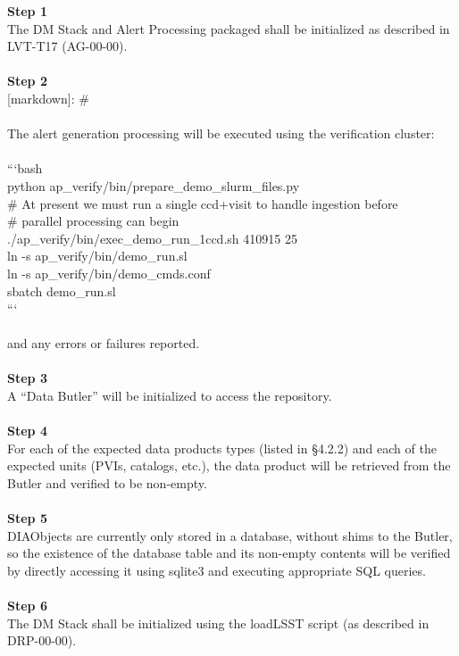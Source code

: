 \textbf{Step 1}\\
The DM Stack and Alert Processing packaged shall be initialized as
described in LVT-T17 (AG-00-00).\\
~\\
\textbf{Step 2}\\
{[}markdown{]}: \#\\
~\\
The alert generation processing will be executed using the verification
cluster:\\
~\\
```bash\\
python ap\_verify/bin/prepare\_demo\_slurm\_files.py\\
\# At present we must run a single ccd+visit to handle ingestion
before\\
\# parallel processing can begin\\
./ap\_verify/bin/exec\_demo\_run\_1ccd.sh 410915 25\\
ln -s ap\_verify/bin/demo\_run.sl\\
ln -s ap\_verify/bin/demo\_cmds.conf\\
sbatch demo\_run.sl\\
```\\
~\\
and any errors or failures reported.\\
~\\
\textbf{Step 3}\\
A ``Data Butler'' will be initialized to access the repository.\\
~\\
\textbf{Step 4}\\
For each of the expected data products types (listed in §4.2.2) and each
of the expected units (PVIs, catalogs, etc.), the data product will be
retrieved from the Butler and verified to be non-empty.\\
~\\
\textbf{Step 5}\\
DIAObjects are currently only stored in a database, without shims to the
Butler, so the existence of the database table and its non-empty
contents will be verified by directly accessing it using sqlite3 and
executing appropriate SQL queries.\\
~\\
\textbf{Step 6}\\
The DM Stack shall be initialized using the loadLSST script (as
described in DRP-00-00).\\
~\\
